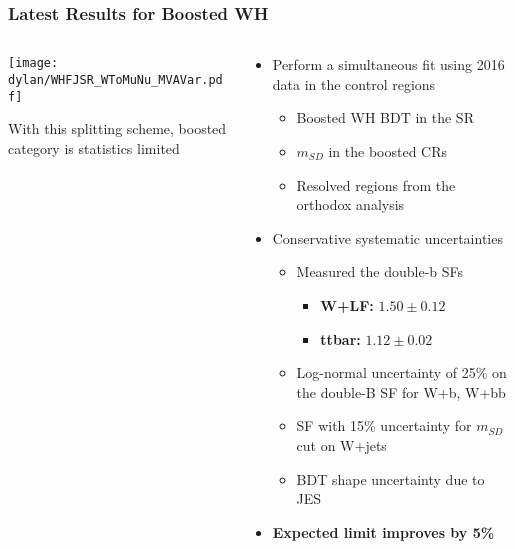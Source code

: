\documentclass{beamer}
\begin{document}
\begin{frame}
  \frametitle{Latest Results for Boosted WH}
  \begin{columns}
    \begin{column}{0.4\linewidth}
      \hspace*{-0.1\linewidth}
      \texttt{[image: dylan/WHFJSR\_WToMuNu\_MVAVar.pdf]}

      {With this splitting scheme, boosted category is statistics limited}

    \end{column}
    \begin{column}{0.7\linewidth}
      \begin{itemize}
      \item Perform a simultaneous fit using 2016 data in the control regions
        \begin{itemize}
        \item Boosted WH BDT in the SR
        \item $m_{SD}$ in the boosted CRs
        \item Resolved regions from the orthodox analysis
        \end{itemize}
      \item Conservative systematic uncertainties
        \begin{itemize}
        \item Measured the double-b SFs
          \begin{itemize}
          \item {\bf W+LF:} $1.50 \pm 0.12$
          \item {\bf ttbar:} $1.12 \pm 0.02$
          \end{itemize}
        \item Log-normal uncertainty of 25\% on the double-B SF for W+b, W+bb
        \item SF with 15\% uncertainty for $m_{SD}$ cut on W+jets
        \item BDT shape uncertainty due to JES
        \end{itemize}
      \item {\bf Expected limit improves by 5\%}
      \end{itemize}
    \end{column}
  \end{columns}
\end{frame}
\end{document}

